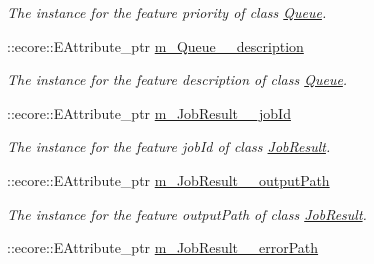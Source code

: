 \begin{DoxyCompactItemize}
\begin{DoxyCompactList}\small\item\em The instance for the feature priority of class \hyperlink{classTMS__Data_1_1Queue}{Queue}. \item\end{DoxyCompactList}\item 
\hypertarget{classTMS__Data_1_1TMS__DataPackage_a681ff05a57b91be8da5113084f108c00}{
::ecore::EAttribute\_\-ptr \hyperlink{classTMS__Data_1_1TMS__DataPackage_a681ff05a57b91be8da5113084f108c00}{m\_\-Queue\_\-\_\-description}}
\label{classTMS__Data_1_1TMS__DataPackage_a681ff05a57b91be8da5113084f108c00}

\begin{DoxyCompactList}\small\item\em The instance for the feature description of class \hyperlink{classTMS__Data_1_1Queue}{Queue}. \item\end{DoxyCompactList}\item 
\hypertarget{classTMS__Data_1_1TMS__DataPackage_a61bff60ce5ce75e8b7cfa8748bbac05d}{
::ecore::EAttribute\_\-ptr \hyperlink{classTMS__Data_1_1TMS__DataPackage_a61bff60ce5ce75e8b7cfa8748bbac05d}{m\_\-JobResult\_\-\_\-jobId}}
\label{classTMS__Data_1_1TMS__DataPackage_a61bff60ce5ce75e8b7cfa8748bbac05d}

\begin{DoxyCompactList}\small\item\em The instance for the feature jobId of class \hyperlink{classTMS__Data_1_1JobResult}{JobResult}. \item\end{DoxyCompactList}\item 
\hypertarget{classTMS__Data_1_1TMS__DataPackage_a1539680e01469af9a4bfad9536358ec5}{
::ecore::EAttribute\_\-ptr \hyperlink{classTMS__Data_1_1TMS__DataPackage_a1539680e01469af9a4bfad9536358ec5}{m\_\-JobResult\_\-\_\-outputPath}}
\label{classTMS__Data_1_1TMS__DataPackage_a1539680e01469af9a4bfad9536358ec5}

\begin{DoxyCompactList}\small\item\em The instance for the feature outputPath of class \hyperlink{classTMS__Data_1_1JobResult}{JobResult}. \item\end{DoxyCompactList}\item 
\hypertarget{classTMS__Data_1_1TMS__DataPackage_aaaade5ee2f9b662f828c249f90ff8e68}{
::ecore::EAttribute\_\-ptr \hyperlink{classTMS__Data_1_1TMS__DataPackage_aaaade5ee2f9b662f828c249f90ff8e68}{m\_\-JobResult\_\-\_\-errorPath}}
\label{classTMS__Data_1_1TMS__DataPackage_aaaade5ee2f9b662f828c249f90ff8e68}


\end{DoxyCompactItemize}
